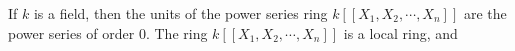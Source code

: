 If $k$ is a field, then the units of the power series ring $k[[X_1, X_2, \cdots, X_n]]$ are the power series of order 0. The ring $k[[X_1, X_2, \cdots, X_n]]$ is a local ring, and